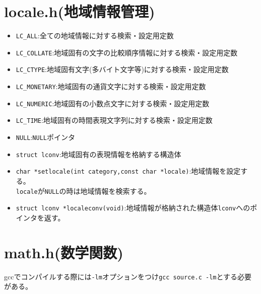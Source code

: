 \section{locale.h(地域情報管理)}
\begin{itemize}
\item \verb|LC_ALL|:全ての地域情報に対する検索・設定用定数
\item \verb|LC_COLLATE|:地域固有の文字の比較順序情報に対する検索・設定用定数
\item \verb|LC_CTYPE|:地域固有文字(多バイト文字等)に対する検索・設定用定数
\item \verb|LC_MONETARY|:地域固有の通貨文字に対する検索・設定用定数
\item \verb|LC_NUMERIC|:地域固有の小数点文字に対する検索・設定用定数
\item \verb|LC_TIME|:地域固有の時間表現文字列に対する検索・設定用定数
\item \verb|NULL|:\verb|NULL|ポインタ
\item \verb|struct lconv|:地域固有の表現情報を格納する構造体
\item \verb|char *setlocale(int category,const char *locale)|:地域情報を設定する。\\ \verb|locale|が\verb|NULL|の時は地域情報を検索する。
\item \verb|struct lconv *localeconv(void)|:地域情報が格納された構造体\verb|lconv|へのポインタを返す。
\end{itemize}

\section{math.h(数学関数)}
gccでコンパイルする際には\verb|-lm|オプションをつけ\verb|gcc source.c -lm|とする必要がある。

